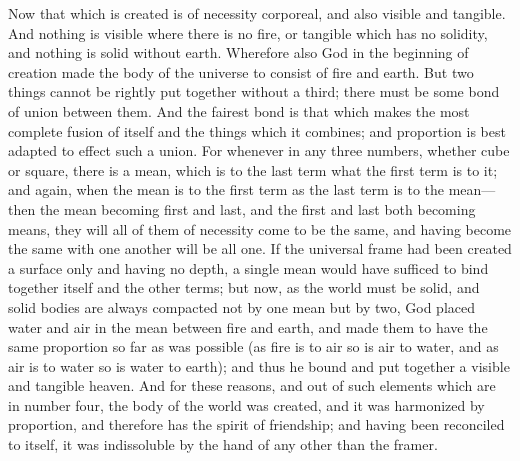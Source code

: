\documentclass[11pt,letter]{article}
\begin{document}
\par  Now that which is created is of necessity corporeal, and also visible and tangible. And nothing is visible where there is no fire, or tangible which has no solidity, and nothing is solid without earth. Wherefore also God in the beginning of creation made the body of the universe to consist of fire and earth. But two things cannot be rightly put together without a third; there must be some bond of union between them. And the fairest bond is that which makes the most complete fusion of itself and the things which it combines; and proportion is best adapted to effect such a union. For whenever in any three numbers, whether cube or square, there is a mean, which is to the last term what the first term is to it; and again, when the mean is to the first term as the last term is to the mean—then the mean becoming first and last, and the first and last both becoming means, they will all of them of necessity come to be the same, and having become the same with one another will be all one. If the universal frame had been created a surface only and having no depth, a single mean would have sufficed to bind together itself and the other terms; but now, as the world must be solid, and solid bodies are always compacted not by one mean but by two, God placed water and air in the mean between fire and earth, and made them to have the same proportion so far as was possible (as fire is to air so is air to water, and as air is to water so is water to earth); and thus he bound and put together a visible and tangible heaven. And for these reasons, and out of such elements which are in number four, the body of the world was created, and it was harmonized by proportion, and therefore has the spirit of friendship; and having been reconciled to itself, it was indissoluble by the hand of any other than the framer.
\end{document}
